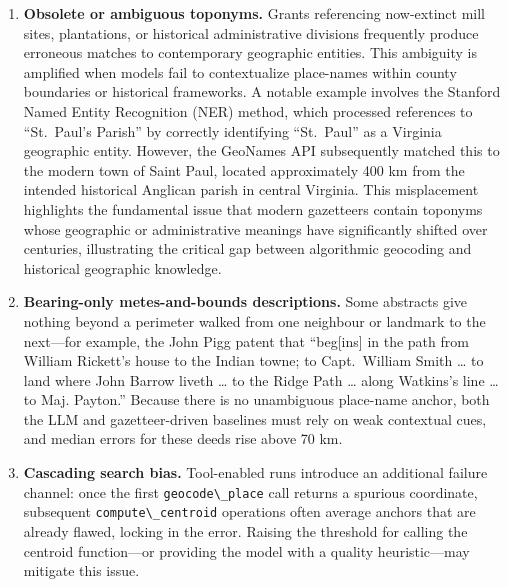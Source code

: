 \documentclass[
  10pt]{article}
\providecommand{\passthrough}[1]{#1}
\begin{document}
\begin{enumerate}
\def\labelenumi{\arabic{enumi}.}
\item
  \textbf{Obsolete or ambiguous toponyms.} Grants referencing
  now-extinct mill sites, plantations, or historical administrative
  divisions frequently produce erroneous matches to contemporary
  geographic entities. This ambiguity is amplified when models fail to
  contextualize place-names within county boundaries or historical
  frameworks. A notable example involves the Stanford Named Entity
  Recognition (NER) method, which processed references to ``St.~Paul's
  Parish'' by correctly identifying ``St.~Paul'' as a Virginia
  geographic entity. However, the GeoNames API subsequently matched this
  to the modern town of Saint Paul, located approximately 400 km from
  the intended historical Anglican parish in central Virginia. This
  misplacement highlights the fundamental issue that modern gazetteers
  contain toponyms whose geographic or administrative meanings have
  significantly shifted over centuries, illustrating the critical gap
  between algorithmic geocoding and historical geographic knowledge.
\item
  \textbf{Bearing-only metes-and-bounds descriptions.} Some abstracts
  give nothing beyond a perimeter walked from one neighbour or landmark
  to the next---for example, the John Pigg patent that ``beg{[}ins{]} in
  the path from William Rickett's house to the Indian towne; to
  Capt.~William Smith \ldots{} to land where John Barrow liveth \ldots{}
  to the Ridge Path \ldots{} along Watkins's line \ldots{} to Maj.
  Payton.'' Because there is no unambiguous place-name anchor, both the
  LLM and gazetteer-driven baselines must rely on weak contextual cues,
  and median errors for these deeds rise above 70 km.
\item
  \textbf{Cascading search bias.} Tool-enabled runs introduce an
  additional failure channel: once the first
  \passthrough{\lstinline!geocode\_place!} call returns a spurious
  coordinate, subsequent \passthrough{\lstinline!compute\_centroid!}
  operations often average anchors that are already flawed, locking in
  the error. Raising the threshold for calling the centroid
  function---or providing the model with a quality heuristic---may
  mitigate this issue.
\end{enumerate}
\end{document}
